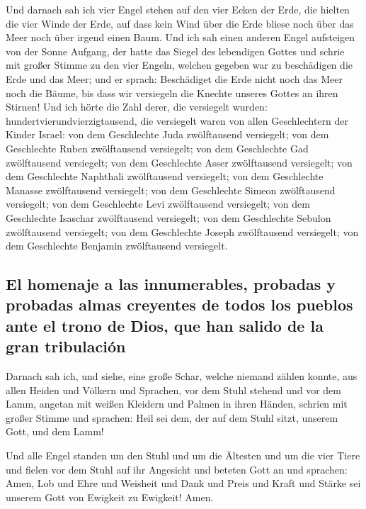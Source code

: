  Und darnach sah ich vier Engel stehen auf den vier Ecken
der Erde, die hielten die vier Winde der Erde, auf dass kein Wind über
die Erde bliese noch über das Meer noch über irgend einen Baum.
 Und ich sah einen anderen Engel aufsteigen von der Sonne
Aufgang, der hatte das Siegel des lebendigen Gottes und schrie mit
großer Stimme zu den vier Engeln, welchen gegeben war zu beschädigen die
Erde und das Meer;  und er sprach: Beschädiget die Erde
nicht noch das Meer noch die Bäume, bis dass wir versiegeln die Knechte
unseres Gottes an ihren Stirnen!  Und ich hörte die Zahl
derer, die versiegelt wurden: hundertvierundvierzigtausend, die
versiegelt waren von allen Geschlechtern der Kinder Israel:
 von dem Geschlechte Juda zwölftausend versiegelt; von dem
Geschlechte Ruben zwölftausend versiegelt; von dem Geschlechte Gad
zwölftausend versiegelt;  von dem Geschlechte Asser
zwölftausend versiegelt; von dem Geschlechte Naphthali zwölftausend
versiegelt; von dem Geschlechte Manasse zwölftausend versiegelt;
 von dem Geschlechte Simeon zwölftausend versiegelt; von
dem Geschlechte Levi zwölftausend versiegelt; von dem Geschlechte
Isaschar zwölftausend versiegelt;  von dem Geschlechte
Sebulon zwölftausend versiegelt; von dem Geschlechte Joseph zwölftausend
versiegelt; von dem Geschlechte Benjamin zwölftausend versiegelt.

\hypertarget{el-homenaje-a-las-innumerables-probadas-y-probadas-almas-creyentes-de-todos-los-pueblos-ante-el-trono-de-dios-que-han-salido-de-la-gran-tribulaciuxf3n}{%
\subsection{El homenaje a las innumerables, probadas y probadas almas
creyentes de todos los pueblos ante el trono de Dios, que han salido de
la gran
tribulación}\label{el-homenaje-a-las-innumerables-probadas-y-probadas-almas-creyentes-de-todos-los-pueblos-ante-el-trono-de-dios-que-han-salido-de-la-gran-tribulaciuxf3n}}

 Darnach sah ich, und siehe, eine große Schar, welche
niemand zählen konnte, aus allen Heiden und Völkern und Sprachen, vor
dem Stuhl stehend und vor dem Lamm, angetan mit weißen Kleidern und
Palmen in ihren Händen,  schrien mit großer Stimme und
sprachen: Heil sei dem, der auf dem Stuhl sitzt, unserem Gott, und dem
Lamm!

 Und alle Engel standen um den Stuhl und um die Ältesten
und um die vier Tiere und fielen vor dem Stuhl auf ihr Angesicht und
beteten Gott an  und sprachen: Amen, Lob und Ehre und
Weisheit und Dank und Preis und Kraft und Stärke sei unserem Gott von
Ewigkeit zu Ewigkeit! Amen.

